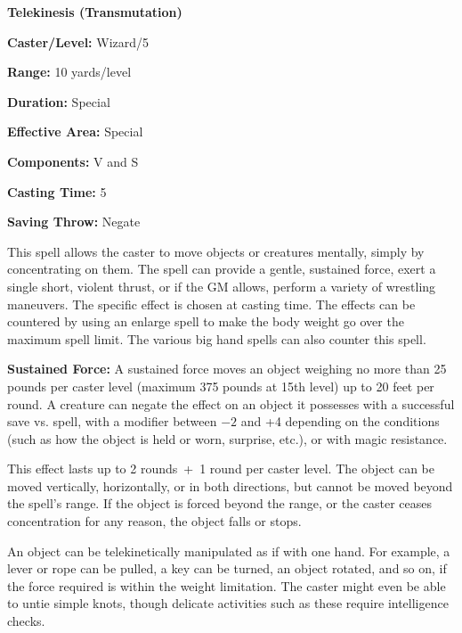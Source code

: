 \begin{multicols}{2}
\vspace{1em}

\noindent
\begin{minipage}{\columnwidth}

\noindent \textbf{Telekinesis (Transmutation)}

\noindent \textbf{Caster/Level:} Wizard/5

\noindent \textbf{Range:} 10 yards/level

\noindent \textbf{Duration:} Special

\noindent \textbf{Effective Area:} Special

\noindent \textbf{Components:} V and S

\noindent \textbf{Casting Time:} 5

\noindent \textbf{Saving Throw:} Negate

\end{minipage}

This spell allows the caster to move objects or creatures mentally, simply by concentrating on them.  The spell can provide a gentle, sustained force, exert a single short, violent thrust, or if the GM allows, perform a variety of wrestling maneuvers.  The specific effect is chosen at casting time.  The effects can be countered by using an enlarge spell to make the body weight go over the maximum spell limit. The various big hand spells can also counter this spell.

\textbf{Sustained Force:}  A sustained force moves an object weighing no more than 25 pounds per caster level (maximum 375 pounds at 15th level) up to 20 feet per round.  A creature can negate the effect on an object it possesses with a successful save vs. spell, with a modifier between $-2$ and +4 depending on the conditions (such as how the object is held or worn, surprise, etc.), or with magic resistance. 

This effect lasts up to 2 rounds~+~1 round per caster level.  The object can be moved vertically, horizontally, or in both directions, but cannot be moved beyond the spell's range.  If the object is forced beyond the range, or the caster ceases concentration for any reason, the object falls or stops. 

An object can be telekinetically manipulated as if with one hand. For example, a lever or rope can be pulled, a key can be turned, an object rotated, and so on, if the force required is within the weight limitation. The caster might even be able to untie simple knots, though delicate activities such as these require intelligence checks.


\end{multicols}
